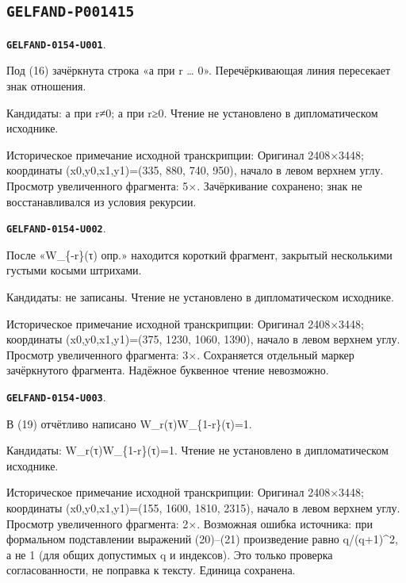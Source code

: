 \documentclass[11pt]{article}
\theoremstyle{definition}
\theoremstyle{remark}
\begin{document}
\subsection*{\texttt{GELFAND-P001415}}
\par\noindent\leavevmode{}\label{GELFAND-0154-U001}\label{GELFAND-P001415:eq16-cancelled:note}\textbf{\texttt{GELFAND-0154-U001}}.\nopagebreak[4]\par
Под (16) зачёркнута строка «а при r … 0». Перечёркивающая линия пересекает знак отношения.\par
Кандидаты: а при r≠0; а при r≥0. Чтение не установлено в дипломатическом исходнике.\par
Историческое примечание исходной транскрипции: Оригинал 2408×3448; координаты (x0,y0,x1,y1)=(335, 880, 740, 950), начало в левом верхнем углу. Просмотр увеличенного фрагмента: 5×. Зачёркивание сохранено; знак не восстанавливался из условия рекурсии.\par\medskip
\par\noindent\leavevmode{}\label{GELFAND-0154-U002}\label{GELFAND-P001415:continued-fraction-cancelled-word:note}\textbf{\texttt{GELFAND-0154-U002}}.\nopagebreak[4]\par
После «W\_\{-r\}(τ) опр.» находится короткий фрагмент, закрытый несколькими густыми косыми штрихами.\par
Кандидаты: не записаны. Чтение не установлено в дипломатическом исходнике.\par
Историческое примечание исходной транскрипции: Оригинал 2408×3448; координаты (x0,y0,x1,y1)=(375, 1230, 1060, 1390), начало в левом верхнем углу. Просмотр увеличенного фрагмента: 3×. Сохраняется отдельный маркер зачёркнутого фрагмента. Надёжное буквенное чтение невозможно.\par\medskip
\par\noindent\leavevmode{}\label{GELFAND-0154-U003}\label{GELFAND-P001415:eq19-right-hand-side:note}\textbf{\texttt{GELFAND-0154-U003}}.\nopagebreak[4]\par
В (19) отчётливо написано W\_r(τ)W\_\{1-r\}(τ)=1.\par
Кандидаты: W\_r(τ)W\_\{1-r\}(τ)=1. Чтение не установлено в дипломатическом исходнике.\par
Историческое примечание исходной транскрипции: Оригинал 2408×3448; координаты (x0,y0,x1,y1)=(155, 1600, 1810, 2315), начало в левом верхнем углу. Просмотр увеличенного фрагмента: 2×. Возможная ошибка источника: при формальном подставлении выражений (20)–(21) произведение равно q/(q+1)\textasciicircum{}2, а не 1 (для общих допустимых q и индексов). Это только проверка согласованности, не поправка к тексту. Единица сохранена.\par\medskip
\end{document}
